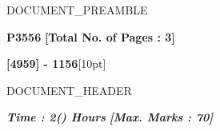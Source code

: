 {{DOCUMENT_PREAMBLE}}


\usepackage{fancyhdr}
\usepackage{lastpage}
\usepackage{titlesec}
\usepackage{multicol}
\usepackage{setspace}

\setlength{\parindent}{0pt}
\setlength{\parskip}{4pt}

\pagestyle{fancy}
\fancyhf{}

\fancyfoot[C]{}
\renewcommand{\headrulewidth}{0pt}
\renewcommand{\footrulewidth}{0pt}

\titlespacing*{\section}{0pt}{8pt}{6pt}





\vspace{4pt}

\begin{flushleft}
\textbf{P3556}
\hfill
\textbf{[Total No. of Pages : 3]}
\end{flushleft}

\vspace{10pt}

\begin{center}
{\Large\textbf{[4959] - 1156}}[10pt]

{{DOCUMENT_HEADER}}

\end{center}

\vspace{8pt}


\begin{flushleft}
\textbf{\textit{Time : 2() Hours}}
\hfill
\textbf{\textit{[Max. Marks : 70]}}
\end{flushleft}

